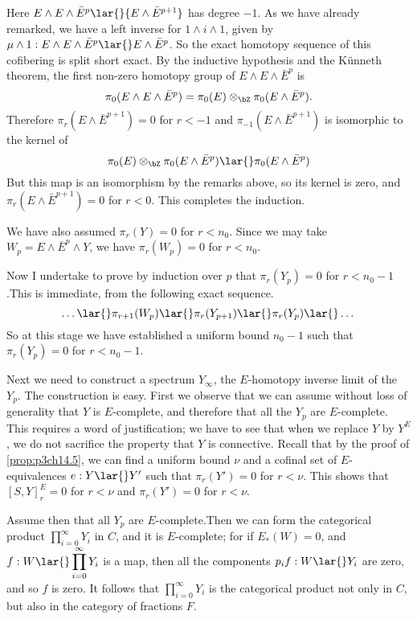\documentclass[../main]{subfiles}
\begin{document}
Here $E\wedge E\wedge\bar{E}^p\lar{}{E\wedge\bar{E}^{p+1}} $ has degree $-1$. As we have already remarked, we have a left inverse for $1\wedge i\wedge 1$, given by $\mu \wedge 1:E\wedge E\wedge \bar{E}^p\lar{}E\wedge\bar{E}^p  $. So the exact homotopy sequence of this cofibering is split short exact. By the inductive hypothesis and the K\"unneth
theorem, the first non-zero homotopy group of $E\wedge E\wedge\bar{E}^p$ is \[\pi_0(E\wedge E\wedge\bar{E}^p) = \pi_0(E) \otimes_\bZ \pi_0(E\wedge \bar{E}^p).\]
Therefore $\pi_r(E\wedge \bar{E}^{p+1})=0$ for $r<-1$ and $\pi_{-1}(E\wedge \bar{E}^{p+1})$ is isomorphic to the kernel of \[\pi_0(E) \otimes_\bZ \pi_0(E\wedge \bar{E}^p) \lar{}\pi_0(E\wedge \bar{E}^p)\] 
But this map is an isomorphism by the remarks above, so its kernel is
zero, and $\pi_{r}(E\wedge \bar{E}^{p+1})=0$ for $r<0$. This completes the induction.

We have also assumed $\pi_r(Y)=0$ for $r<n_0$. Since we may take $W_p=E\wedge \bar{E}^p\wedge Y$, we have $\pi_r(W_p)=0$ for $r<n_0$.

Now I undertake to prove by induction over $p$ that $\pi_r(Y_p)=0$ for $r<n_0-1$.This is immediate, from the following exact sequence. \[\dots \lar{}\pi_{r+1}(W_p)\lar{} \pi_r(Y_{p+1}) \lar{} \pi_r(Y_p)\lar{} \dots \]
So at this stage we have established a uniform bound $n_0-1$ such that $\pi_r(Y_p)=0$ for $r<n_0-1$.

Next we need to construct a spectrum $Y_\infty$, the $E$-homotopy inverse 
limit of the $Y_p$. The construction is easy. First we observe that we
can assume without loss of generality that $Y$ is $E$-complete, and therefore that all the $Y_p$ are $E$-complete. This requires a word of
justification; we have to see that when we replace $Y$ by $Y^E$, we do not
sacrifice the property that $Y$ is connective. Recall that by the proof of \ref{prop:p3ch14.5}, we can find a uniform bound $\nu$ and a cofinal set of
$E$-equivalences $e: Y\lar{} Y'$ such that $\pi_r (Y')=0$ for $r<\nu$. This
shows that $[S,Y]^E_r=0$ for $r<\nu$ and $\pi_r(Y')=0$ for $r<\nu$.

Assume then that all $Y_p$ are $E$-complete.Then we can form the categorical product $\displaystyle \prod_{i=0}^\infty Y_i $ in $C$, and it is $E$-complete; for if $E_\ast(W)=0$, and $\displaystyle f:W\lar{} \prod_{i=0}^\infty Y_i$ is a map, then all the components $p_i f:W\lar{}Y_i$ are zero, and so $f$ is zero. It follows that $\displaystyle\prod_{i=0}^\infty Y_i$ is the categorical product not only in $C$, but also in the category of fractions $F$.
\end{document}
